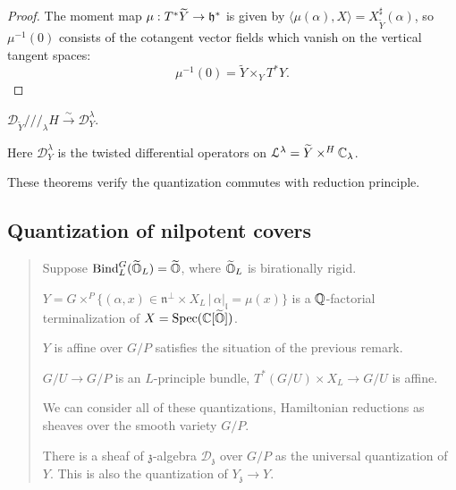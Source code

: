 \documentclass[12pt]{amsart}
\numberwithin{equation}{section}
\newcommand{\fl}{\mathfrak{l}} \newcommand{\fm}{\mathfrak{m}} \newcommand{\fn}{\mathfrak{n}}
\newcommand{\fz}{\mathfrak{z}}
\newcommand{\Spec}{\mathrm{Spec}}
\renewcommand{\tilde}{\widetilde}
\newcommand{\set}[2]{\{#1\,|\,#2\}}
\newcommand{\aiblock}[1]{
  \begin{quote} 
  {\color{CadetBlue}\sffamily\small #1}
  \end{quote}
}
\begin{document}
\begin{proof}
  The moment map $\mu: T^*\tilde{Y} \to \fh^*$ is given by $\langle \mu(\alpha), X \rangle = X^{\sharp}_{\tilde{Y}}(\alpha)$, so $\mu^{-1}(0)$ consists of the cotangent vector fields which vanish on the vertical tangent spaces:
  \[
    \mu^{-1}(0) = \tilde{Y} \times_{Y} T^*Y.
  \]
\end{proof}

\begin{thm}
  $\mathcal{D}_{\tilde{Y}} \mathbin{/\!/\!/}_{\lambda} H \xrightarrow{\sim} \mathcal{D}^{\lambda}_{Y}$.

  Here $\mathcal{D}^{\lambda}_{Y}$ is the twisted differential operators on $\mathcal{L}^{\lambda} = \tilde{Y} \times^{H} \BC_{\lambda}$.
\end{thm}

These theorems verify the quantization commutes with reduction principle.


\subsection{Quantization of nilpotent covers}


\aiblock{
Suppose $\mathrm{Bind}_{L}^{G}(\tilde{\BO}_L) = \tilde{\BO}$, where $\tilde{\BO}_L$ is birationally rigid.

$Y = G \times^{P} \set{(\alpha,x) \in \fn^{\perp} \times X_L }{\alpha|_{\fl} = \mu(x) } $ is a ${\mathbb {Q}}$-factorial terminalization of $X = \Spec(\BC[\tilde{\BO}])$.

$Y$ is affine over $G/P$ satisfies the situation of the previous remark.

$G/U \to G/P$ is an $L$-principle bundle, $T^*(G/U) \times X_L \to G/U$ is affine.

We can consider all of these quantizations, Hamiltonian reductions as sheaves over the smooth variety $G/P$.

There is a sheaf of $\fz$-algebra $\mathcal{D}_{\fz}$ over $G/P$ as the universal quantization of $Y$. This is also the quantization of $Y_{\fz} \to Y$.
}









\newpage
\printbibliography
\end{document}
